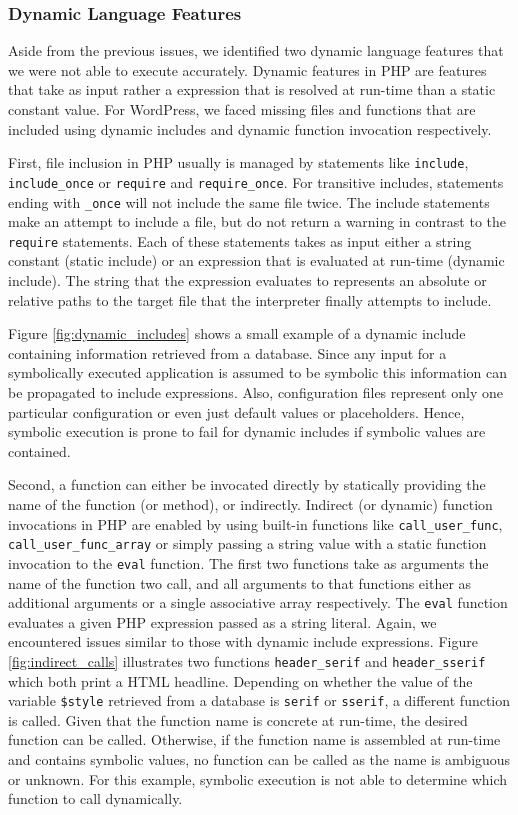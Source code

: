 \documentclass[sigconf]{acmart}
\renewcommand{\sf}[1]{\textsf{#1}}
\renewcommand{\tt}[1]{\texttt{#1}}
\begin{document}
\subsubsection{Dynamic Language Features}
\label{sec:experiment_dynamicfeatures} 
Aside from the previous issues, we identified two dynamic language features
that we were not able to execute accurately. Dynamic features in PHP are
features that take as input rather a expression that is resolved at run-time
than a static constant value. For \sf{WordPress}, we faced missing files and
functions that are included using dynamic includes and dynamic function
invocation respectively.

First, file inclusion in PHP usually is managed by statements like \tt{include},
\tt{include\_once} or \tt{require} and \tt{require\_once}. For transitive
includes, statements ending with \tt{\_once} will not include the same file
twice. The include statements make an attempt to include a file, but do not
return a warning in contrast to the \tt{require} statements. Each of these
statements takes as input either a string constant (static include) or an
expression that is evaluated at run-time (dynamic include). The string that the
expression evaluates to represents an absolute or relative paths to the target
file that the interpreter finally attempts to include.

Figure \ref{fig:dynamic_includes} shows a small example of a dynamic include containing
information retrieved from a database. Since any input for a symbolically
executed application is assumed to be symbolic this information can be
propagated to include expressions. Also, configuration files represent only one particular
configuration or even just default values or placeholders. Hence, symbolic
execution is prone to fail for dynamic includes if symbolic values are
contained.

Second, a function can either be invocated directly by statically providing the
name of the function (or method), or indirectly. Indirect (or dynamic) function
invocations in PHP are enabled by using built-in functions like
\tt{call\_user\_func}, \tt{call\_user\_func\_array} or simply passing a string
value with a static function invocation to the \tt{eval} function. The first two
functions take as arguments the name of the function two call, and all arguments to that
functions either as additional arguments or a single associative array
respectively.
The \tt{eval} function evaluates a given PHP expression passed as a string
literal.
Again, we encountered issues similar to those with dynamic include expressions.
Figure \ref{fig:indirect_calls} illustrates two functions \tt{header\_serif}
and \tt{header\_sserif} which both print a HTML headline. Depending on whether
the value of the variable \tt{\$style} retrieved from a database is \tt{serif}
or \tt{sserif}, a different function is called. Given that the function name is
concrete at run-time, the desired function can be called. Otherwise, if the
function name is assembled at run-time and contains symbolic values, no
function can be called as the name is ambiguous or unknown. For this example,
symbolic execution is not able to determine which function to call dynamically.
\end{document}
